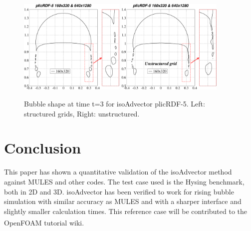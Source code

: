 \documentclass[review]{elsarticle}
\begin{document}
\begin{figure}[!h]
\begin{center}
 \includegraphics[width=0.45\textwidth]{figures/bubble_shape_t=3_plicRDF5-struct.pdf}
 \hspace{2mm}
 \includegraphics[width=0.45\textwidth]{figures/bubble_shape_t=3_plicRDF5-uns.pdf}
 \vspace{-6mm}
\end{center}
\caption{Bubble shape at time t=3 for isoAdvector plicRDF-5. Left: structured grids, Right: unstructured.}
\label{fig:HB_bubble_shape_3_plicRDF5}
\end{figure}




\section{\small Conclusion}
This paper has shown a quantitative validation of the isoAdvector method against MULES and other 
codes. The test case used is the Hysing benchmark, both in 2D and 3D. isoAdvector has been verified to work for rising bubble simulation with similar accuracy as MULES and with a sharper interface and slightly smaller calculation times.
This reference case will be contributed to the OpenFOAM\textsuperscript{\textregistered} tutorial wiki.
\end{document}

